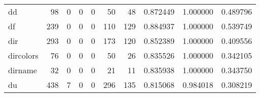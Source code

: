 \begin{longtable}{lrrrrrrrrr}
dd        &                                        98 &                                                  0 &                                                  0 &                                                  0 &                                                 50 &                                                 48 &                                           0.872449 &                               1.000000 &                             0.489796 \\
df        &                                       239 &                                                  0 &                                                  0 &                                                  0 &                                                110 &                                                129 &                                           0.884937 &                               1.000000 &                             0.539749 \\
dir       &                                       293 &                                                  0 &                                                  0 &                                                  0 &                                                173 &                                                120 &                                           0.852389 &                               1.000000 &                             0.409556 \\
dircolors &                                        76 &                                                  0 &                                                  0 &                                                  0 &                                                 50 &                                                 26 &                                           0.835526 &                               1.000000 &                             0.342105 \\
dirname   &                                        32 &                                                  0 &                                                  0 &                                                  0 &                                                 21 &                                                 11 &                                           0.835938 &                               1.000000 &                             0.343750 \\
du        &                                       438 &                                                  7 &                                                  0 &                                                  0 &                                                296 &                                                135 &                                           0.815068 &                               0.984018 &                             0.308219 \\

\end{longtable}
